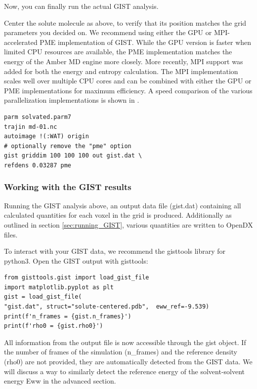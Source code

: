 \documentclass[9pt,tutorial]{livecoms}
\begin{document}
Now, you can finally run the actual GIST analysis.

Center the solute molecule as above, to verify that its position matches the grid parameters you decided on.
We recommend using either the GPU or MPI-accelerated PME implementation of GIST.
While the GPU version is faster when limited CPU resources are available, the PME implementation matches the energy of the Amber MD engine more closely.
More recently, MPI support was added for both the energy and entropy calculation\cite{Roe2023-mpi-gist}. 
The MPI implementation scales well over multiple CPU cores and can be combined with either the GPU or PME implementations for maximum efficiency. 
A speed comparison of the various parallelization implementations is shown in \cite{Roe2023-mpi-gist}.

\begin{lstlisting}[style=cpptraj]
parm solvated.parm7
trajin md-01.nc
autoimage !(:WAT) origin
# optionally remove the "pme" option
gist griddim 100 100 100 out gist.dat \
refdens 0.03287 pme
\end{lstlisting}
\subsubsection{Working with the GIST results}
Running the GIST analysis above, an output data file (gist.dat) containing all calculated quantities for each voxel in the grid is produced. 
Additionally as outlined in section \ref{sec:running_GIST}, various quantities are written to OpenDX files.

To interact with your GIST data, we recommend the gisttools library for python3. Open the GIST output with gisttools:
\begin{lstlisting}[style=python]
from gisttools.gist import load_gist_file
import matplotlib.pyplot as plt
gist = load_gist_file(
"gist.dat", struct="solute-centered.pdb",  eww_ref=-9.539)
print(f'n_frames = {gist.n_frames}')
print(f'rho0 = {gist.rho0}')
\end{lstlisting}
All information from the output file is now accessible through the gist object. 
If the number of frames of the simulation (n\_frames) and the reference density (rho0) are not provided, they are automatically detected from the GIST data. 
We will discuss a way to similarly detect the reference energy of the solvent-solvent energy Eww in the advanced section.
\end{document}

